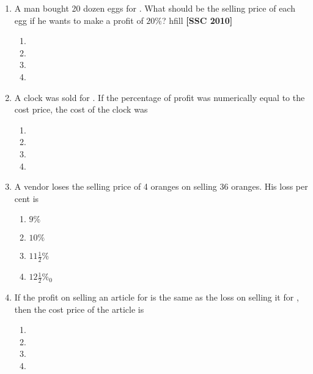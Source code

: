\documentclass[twocolumn]{article}
\begin{document}
\begin{enumerate}
        \item A man bought 20 dozen eggs for . What should be the selling price of each egg if he wants to make a profit of $20 \%$? hfill {\bf[SSC 2010]}
            \begin{enumerate}
                \item {}
                \item {}
                \item {}
                \item {}
            \end{enumerate}
            
        \item A clock was sold for . If the percentage of profit was numerically equal to the cost price, the cost of the clock was
            \begin{enumerate}
                \item {}
                \item {}
                \item {}
                \item {}
            \end{enumerate}
            
        \item A vendor loses the selling price of 4 oranges on selling 36 oranges. His loss per cent is
            \begin{enumerate}
                \item $9 \%$
                \item $10 \%$
                \item $11 \frac{1}{2} \%$
                \item $12 \frac{1}{2} \%_{0}$
            \end{enumerate}
            
        \item If the profit on selling an article for  is the same as the loss on selling it for , then the cost price of the article is
            \begin{enumerate}
                \item {}
                \item {}
                \item {}
                \item {}
            \end{enumerate}
            

\end{enumerate}
\end{document}
